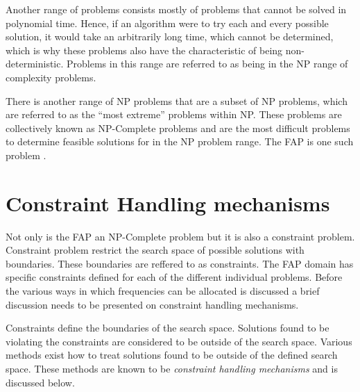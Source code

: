 Another range of problems consists mostly of problems that cannot be solved in polynomial time\cite{AIModernApproach}. Hence, if an algorithm were to try each and every possible solution, it would take an arbitrarily long time, which cannot be determined, which is why these problems also have the characteristic of being non-deterministic\cite{AIModernApproach}. Problems in this range are referred to as being in the NP range of complexity problems\cite{AIModernApproach}.

There is another range of NP problems that are a subset of NP problems, which are referred to as the ``most extreme'' problems within NP\@.  These problems are collectively known as NP-Complete problems and are the most difficult problems to determine feasible solutions for in the NP problem range\cite{AIModernApproach}. The \gls{FAP} is one such problem \cite{AndreasPaper,FixedFAPPSO}.

\section{Constraint Handling mechanisms}
\label{sec:chm}
Not only is the \gls{FAP} an NP-Complete problem but it is also a constraint problem. Constraint problem restrict the search space of possible solutions with boundaries. These boundaries are reffered to as constraints. The \gls{FAP} domain has specific constraints defined for each of the different individual problems. Before the various ways in which frequencies can be allocated is discussed a brief discussion needs to be presented on constraint handling mechanisms.

Constraints define the boundaries of the search space. Solutions found to be violating the constraints are considered to be outside of the search space. Various methods exist how to treat solutions found to be outside of the defined search space. These methods are known to be \emph{constraint handling mechanisms} and is discussed below.

